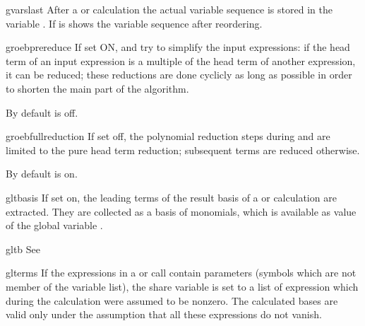 
\begin{Variable}{gvarslast}
After a  or  calculation
the actual variable sequence is stored in the variable 
. If  is 
 shows the variable sequence after reordering.
\end{Variable}


\begin{Switch}{groebprereduce}
If  set ON,  
and  try to simplify the
input expressions: if the head term of an input expression is a
multiple of the head term of another expression, it can be reduced;
these reductions are done cyclicly as long as possible in order to
shorten the main part of the algorithm.

By default  is off.
\end{Switch}


\begin{Switch}{groebfullreduction}
If  set off, the polynomial reduction steps during
 and  are limited to the pure head
term reduction; subsequent terms are reduced otherwise.

By default  is on.
\end{Switch}


\begin{Switch}{gltbasis}
If  set on, the leading terms of the result basis 
of a  or  calculation are
extracted. They are collected as a basis of monomials, which is
available as value of the global variable .
\end{Switch}
\begin{Variable}{gltb}
See 
\end{Variable}

\begin{Variable}{glterms}
If the expressions in a  or  
call contain parameters (symbols
which are not member of the variable list), the share variable
 is set to a list of expression which during the
calculation were assumed to be nonzero. The calculated bases 
are valid only under the assumption that all these expressions do
not vanish.
\end{Variable}

